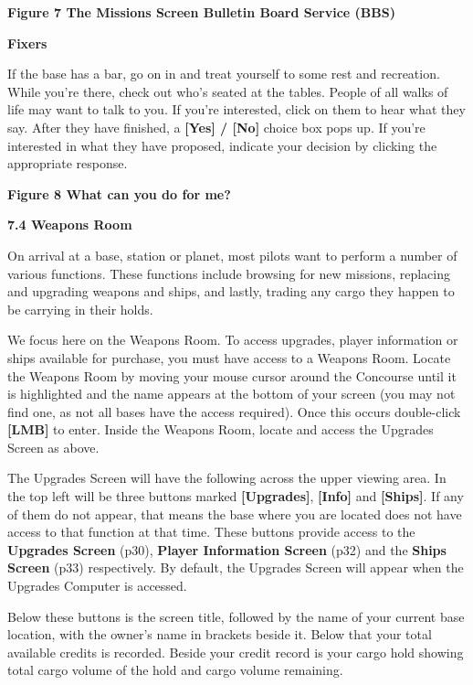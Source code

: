 \documentclass{article}
\begin{document}
\textbf{ Figure 7 The Missions Screen Bulletin Board Service (BBS)}

\textbf{}

\textbf{Fixers }

If the base has a bar, go on in and treat yourself to some rest and recreation. While you're there, check out who's seated at the tables. People of all walks of life may want to talk to you. If you're interested, click on them to hear what they say. After they have finished, a \textbf{[Yes] / [No] }choice box pops up. If you're interested in what they have proposed, indicate your decision by clicking the appropriate response. 

\textbf{Figure 8 What can you do for me? }





\textbf{7.4 Weapons Room }

On arrival at a base, station or planet, most pilots want to perform a number of various functions. These functions include browsing for new missions, replacing and upgrading weapons and ships, and lastly, trading any cargo they happen to be carrying in their holds. 

We focus here on the Weapons Room. To access upgrades, player information or ships available for purchase, you must have access to a Weapons Room. Locate the Weapons Room by moving your mouse cursor around the Concourse until it is highlighted and the name appears at the bottom of your screen (you may not find one, as not all bases have the access required). Once this occurs double-click \textbf{[LMB] }to enter.  Inside the Weapons Room, locate and access the Upgrades Screen as above. 

The Upgrades Screen will have the following across the upper viewing area. In the top left will be three buttons marked \textbf{[Upgrades]}, \textbf{[Info] }and \textbf{[Ships]}. If any of them do not appear, that means the base where you are located does not have access to that function at that time. These buttons provide access to the \textbf{Upgrades Screen }(p30), \textbf{Player Information Screen }(p32) and the \textbf{Ships Screen }(p33) respectively. By default, the Upgrades Screen will appear when the Upgrades Computer is accessed. 

Below these buttons is the screen title, followed by the name of your current base location, with the owner's name in brackets beside it. Below that your total available credits is recorded. Beside your credit record is your cargo hold showing total cargo volume of the hold and cargo volume remaining. 
\end{document}

